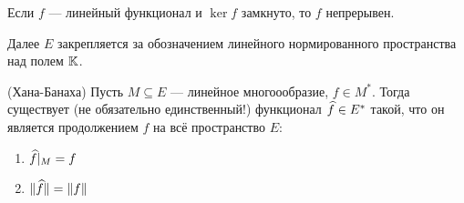 \begin{task}
	Если $f$ --- линейный функционал и $\ker f$ замкнуто, то $f$ непрерывен.
\end{task}

\begin{note}
	Далее $E$ закрепляется за обозначением линейного нормированного пространства над полем $\mathbb{K}$.
\end{note}

\begin{theorem} (Хана-Банаха)
	Пусть $M \subseteq E$ --- линейное многоообразие, $f \in M^*$. Тогда существует (не обязательно единственный!) функционал $\widehat{f} \in E^*$ такой, что он является продолжением $f$ на всё пространство $E$:
	\begin{enumerate}
		\item $\widehat{f}|_M = f$
		
		\item $\|\widehat{f}\| = \|f\|$
	\end{enumerate}
\end{theorem}